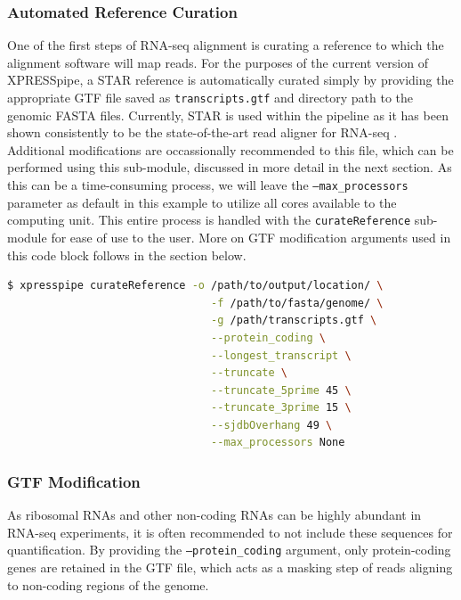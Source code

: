 \documentclass[11pt, a4paper, oneside]{article}
\begin{document}
\subsubsection{Automated Reference Curation}
One of the first steps of RNA-seq alignment is curating a reference to which the alignment software will map reads. For the purposes of the current version of XPRESSpipe, a STAR \cite{star} reference is automatically curated simply by providing the appropriate GTF file saved as \texttt{transcripts.gtf} and directory path to the genomic FASTA files. Currently, STAR is used within the pipeline as it has been shown consistently to be the state-of-the-art read aligner for RNA-seq \cite{alignment_benchmark}. Additional modifications are occassionally recommended to this file, which can be performed using this sub-module, discussed in more detail in the next section. As this can be a time-consuming process, we will leave the \texttt{--max\_processors} parameter as default in this example to utilize all cores available to the computing unit. This entire process is handled with the \texttt{curateReference} sub-module for ease of use to the user. More on GTF modification arguments used in this code block follows in the section below.
\newline
\begin{lstlisting}[language=bash, caption=curateReference example]
$ xpresspipe curateReference -o /path/to/output/location/ \
                                -f /path/to/fasta/genome/ \
                                -g /path/transcripts.gtf \
                                --protein_coding \
                                --longest_transcript \
                                --truncate \
                                --truncate_5prime 45 \
                                --truncate_3prime 15 \
                                --sjdbOverhang 49 \
                                --max_processors None
\end{lstlisting}


\subsubsection{GTF Modification}
As ribosomal RNAs and other non-coding RNAs can be highly abundant in RNA-seq experiments, it is often recommended to not include these sequences for quantification. By providing the \texttt{--protein\_coding} argument, only protein-coding genes are retained in the GTF file, which acts as a masking step of reads aligning to non-coding regions of the genome. \par
\end{document}
